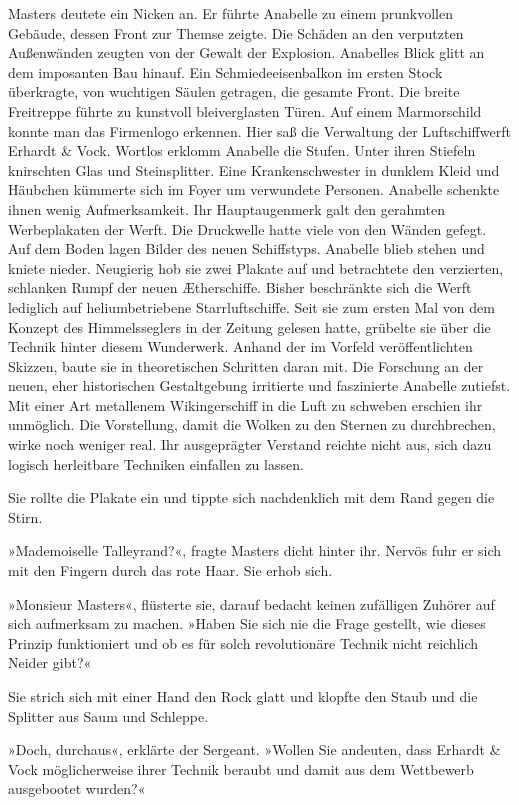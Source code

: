 Masters deutete ein Nicken an. Er führte Anabelle zu einem
prunkvollen Gebäude, dessen Front zur Themse zeigte. Die Schäden an
den verputzten Außenwänden zeugten von der Gewalt der Explosion.
Anabelles Blick glitt an dem imposanten Bau hinauf. Ein
Schmiedeeisenbalkon im ersten Stock überkragte, von wuchtigen
Säulen getragen, die gesamte Front. Die breite Freitreppe führte zu
kunstvoll bleiverglasten Türen. Auf einem Marmorschild konnte man
das Firmenlogo erkennen. Hier saß die Verwaltung der
Luftschiffwerft Erhardt \& Vock. Wortlos erklomm Anabelle die
Stufen. Unter ihren Stiefeln knirschten Glas und Steinsplitter.
Eine Krankenschwester in dunklem Kleid und Häubchen kümmerte sich
im Foyer um verwundete Personen. Anabelle schenkte ihnen wenig
Aufmerksamkeit. Ihr Hauptaugenmerk galt den gerahmten Werbeplakaten
der Werft. Die Druckwelle hatte viele von den Wänden gefegt. Auf
dem Boden lagen Bilder des neuen Schiffstyps. Anabelle blieb stehen
und kniete nieder. Neugierig hob sie zwei Plakate auf und
betrachtete den verzierten, schlanken Rumpf der neuen Ætherschiffe.
Bisher beschränkte sich die Werft lediglich auf heliumbetriebene
Starrluftschiffe. Seit sie zum ersten Mal von dem Konzept des
Himmelsseglers in der Zeitung gelesen hatte, grübelte sie über die
Technik hinter diesem Wunderwerk. Anhand der im Vorfeld
veröffentlichten Skizzen, baute sie in theoretischen Schritten
daran mit. Die Forschung an der neuen, eher historischen
Gestaltgebung irritierte und faszinierte Anabelle zutiefst. Mit
einer Art metallenem Wikingerschiff in die Luft zu schweben
erschien ihr unmöglich. Die Vorstellung, damit die Wolken zu den
Sternen zu durchbrechen, wirke noch weniger real. Ihr ausgeprägter
Verstand reichte nicht aus, sich dazu logisch herleitbare Techniken
einfallen zu lassen.

Sie rollte die Plakate ein und tippte sich nachdenklich mit dem
Rand gegen die Stirn.

»Mademoiselle Talleyrand?«, fragte Masters dicht hinter ihr. Nervös
fuhr er sich mit den Fingern durch das rote Haar. Sie erhob sich.

»Monsieur Masters«, flüsterte sie, darauf bedacht keinen zufälligen
Zuhörer auf sich aufmerksam zu machen. »Haben Sie sich nie die
Frage gestellt, wie dieses Prinzip funktioniert und ob es für solch
revolutionäre Technik nicht reichlich Neider gibt?«

Sie strich sich mit einer Hand den Rock glatt und klopfte den Staub
und die Splitter aus Saum und Schleppe.

»Doch, durchaus«, erklärte der Sergeant. »Wollen Sie andeuten, dass
Erhardt \& Vock möglicherweise ihrer Technik beraubt und damit aus
dem Wettbewerb ausgebootet wurden?«

